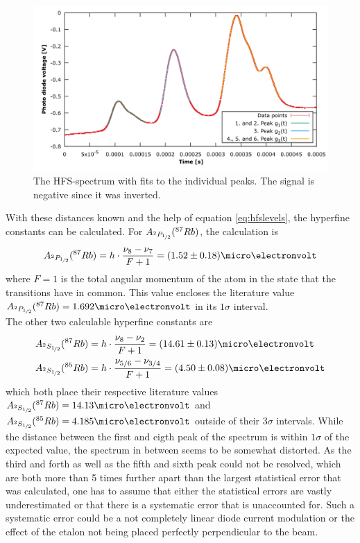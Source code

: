 \begin{figure}[htb]
	\centering
	\includegraphics[width=1.0\linewidth]{graphics/HFS_fits}
	\caption[The HFS-spectrum]{The HFS-spectrum with fits to the individual peaks. The signal is negative since it was inverted.}
	\label{fig:HFS_fits}
\end{figure}


With these distances known and the help of equation \ref{eq:hfslevels}, the hyperfine constants can be calculated. For $A_{^2P_{\nicefrac{1}{2}}}(^{87}Rb)$, the calculation is
\begin{equation}
	A_{^2P_{\nicefrac{1}{2}}}(^{87}Rb)=h\cdot\frac{\nu_8-\nu_7}{F+1}=\unit{(1.52\pm0.18)}{\micro\electronvolt}
\end{equation}
where $F=1$ is the total angular momentum of the atom in the state that the transitions have in common. This value encloses the literature value $A_{^2P_{\nicefrac{1}{2}}}(^{87}Rb)=\unit{1.692}{\micro\electronvolt}$ \cite{corney} in its $1\sigma$ interval.\\
The other two calculable hyperfine constants are
\begin{align}
	A_{^2S_{\nicefrac{1}{2}}}(^{87}Rb)&=h\cdot\frac{\nu_8-\nu_2}{F+1}=\unit{(14.61\pm0.13)}{\micro\electronvolt}\\
	A_{^2S_{\nicefrac{1}{2}}}(^{85}Rb)&=h\cdot\frac{\nu_{5/6}-\nu_{3/4}}{F+1}=\unit{(4.50\pm0.08)}{\micro\electronvolt}
\end{align}
which both place their respective literature values $A_{^2S_{\nicefrac{1}{2}}}(^{87}Rb)=\unit{14.13}{\micro\electronvolt}$ and $A_{^2S_{\nicefrac{1}{2}}}(^{85}Rb)=\unit{4.185}{\micro\electronvolt}$ outside of their $3\sigma$ intervals. While the distance between the first and eigth peak of the spectrum is within $1\sigma$ of the expected value, the spectrum in between seems to be somewhat distorted. As the third and forth as well as the fifth and sixth peak could not be resolved, which are both more than 5 times further apart than the largest statistical error that was calculated, one has to assume that either the statistical errors are vastly underestimated or that there is a systematic error that is unaccounted for. Such a systematic error could be a not completely linear diode current modulation or the effect of the etalon not being placed perfectly perpendicular to the beam.

